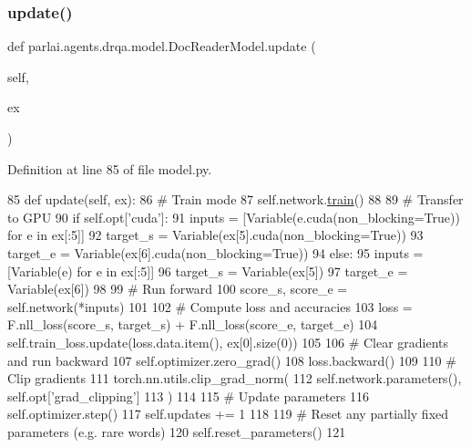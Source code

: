 \subsubsection{\texorpdfstring{update()}{update()}}
{\footnotesize\ttfamily def parlai.\+agents.\+drqa.\+model.\+Doc\+Reader\+Model.\+update (\begin{DoxyParamCaption}\item[{}]{self,  }\item[{}]{ex }\end{DoxyParamCaption})}



Definition at line 85 of file model.\+py.


\begin{DoxyCode}
85     \textcolor{keyword}{def }update(self, ex):
86         \textcolor{comment}{# Train mode}
87         self.network.\hyperlink{namespaceprojects_1_1mastering__the__dungeon_1_1mturk_1_1tasks_1_1MTD_1_1run_a36a5f4f6f9df0611a6818610518d2cf0}{train}()
88 
89         \textcolor{comment}{# Transfer to GPU}
90         \textcolor{keywordflow}{if} self.opt[\textcolor{stringliteral}{'cuda'}]:
91             inputs = [Variable(e.cuda(non\_blocking=\textcolor{keyword}{True})) \textcolor{keywordflow}{for} e \textcolor{keywordflow}{in} ex[:5]]
92             target\_s = Variable(ex[5].cuda(non\_blocking=\textcolor{keyword}{True}))
93             target\_e = Variable(ex[6].cuda(non\_blocking=\textcolor{keyword}{True}))
94         \textcolor{keywordflow}{else}:
95             inputs = [Variable(e) \textcolor{keywordflow}{for} e \textcolor{keywordflow}{in} ex[:5]]
96             target\_s = Variable(ex[5])
97             target\_e = Variable(ex[6])
98 
99         \textcolor{comment}{# Run forward}
100         score\_s, score\_e = self.network(*inputs)
101 
102         \textcolor{comment}{# Compute loss and accuracies}
103         loss = F.nll\_loss(score\_s, target\_s) + F.nll\_loss(score\_e, target\_e)
104         self.train\_loss.update(loss.data.item(), ex[0].size(0))
105 
106         \textcolor{comment}{# Clear gradients and run backward}
107         self.optimizer.zero\_grad()
108         loss.backward()
109 
110         \textcolor{comment}{# Clip gradients}
111         torch.nn.utils.clip\_grad\_norm(
112             self.network.parameters(), self.opt[\textcolor{stringliteral}{'grad\_clipping'}]
113         )
114 
115         \textcolor{comment}{# Update parameters}
116         self.optimizer.step()
117         self.updates += 1
118 
119         \textcolor{comment}{# Reset any partially fixed parameters (e.g. rare words)}
120         self.reset\_parameters()
121 
\end{DoxyCode}


